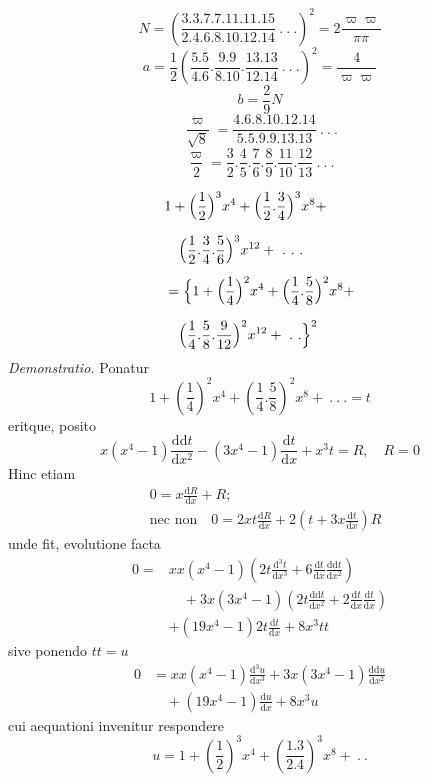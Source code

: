 
\[
N=\left(\frac{3.3.7.7.11.11.15}{2.4.6.8.10.12.14}\ .\ .\ .\right)^2
=2\frac{\varpi\varpi}{\pi\pi}
\]
\[
a=\frac12\left(\frac{5.5}{4.6}.\frac{9.9}{8.10}.\frac{13.13}{12.14}\ .\ .\ .\right)^2
=\frac4{\varpi\varpi}
\]
\[
b=\frac29N
\]
\[
\frac{\varpi}{\surd 8}=\frac{4.6.8.10.12.14}{5.5.9.9.13.13}\ .\ .\ .
\]
\[
\frac{\varpi}{2}=\frac32.\frac45.\frac76.\frac89.\frac{11}{10}.\frac{12}{13}\ .\ .\ .
\]

\[
\begin{aligned}
&1+\Bigl(\frac12\Bigr)^3x^4+\Bigl(\frac12.\frac34\Bigr)^3x^8+
\\[7pt]&\quad{}\Bigl(\frac12.\frac34.\frac56\Bigr)^3x^{12}+\ .\ .\ .\\[5pt]
&=\Bigl\{1+\Bigl(\frac14\Bigr)^2x^4+\Bigl(\frac14.\frac58\Bigr)^2x^8+
\\[7pt]&\quad{}\Bigl(\frac14.\frac58.\frac9{12}\Bigr)^2x^{12}+\ .\ .\Bigr\}^2
\end{aligned}
\]
\textit{Demonstratio.} Ponatur
\[
1+\left(\frac14\right)^2x^4+\left(\frac14.\frac58\right)^2x^8+\ .\ .\ .=t
\]
eritque, posito
\[
x(x^4-1)\frac{\mathrm{dd}t}{\mathrm dx^2}-(3x^4-1)\frac{\mathrm dt}{\mathrm dx}+x^3t=R,\quad R=0
\]
Hinc etiam
\[
\begin{aligned}&0=x\frac{\mathrm dR}{\mathrm dx}+R;\\[7pt]&\text{nec non}\quad
0=2xt\frac{\mathrm dR}{\mathrm dx}+2\left(t+3x\frac{\mathrm dt}{\mathrm dx}\right)R\end{aligned}
\]
unde fit, evolutione facta
\[
\begin{aligned}
0={}&xx(x^4-1)\left(2t\frac{\mathrm d^3t}{\mathrm dx^3}+6\frac{\mathrm dt}{\mathrm dx}\frac{\mathrm{dd}t}{\mathrm dx^2}\right)
\\[7pt]&\quad{}+3x(3x^4-1)\left(2t\frac{\mathrm{dd}t}{\mathrm dx^2}+2\frac{\mathrm dt}{\mathrm dx}\frac{\mathrm dt}{\mathrm dx}\right)\\[5pt]
&+(19x^4-1)2t\frac{\mathrm dt}{\mathrm dx}+8x^3tt
\end{aligned}
\]
sive ponendo $tt=u$
\[
\begin{aligned}0&=xx(x^4-1)\frac{\mathrm d^3u}{\mathrm dx^3}+3x(3x^4-1)\frac{\mathrm{dd}u}{\mathrm dx^2}
\\[7pt]&\quad{}+(19x^4-1)\frac{\mathrm du}{\mathrm dx}+8x^3u\end{aligned}
\]
cui aequationi invenitur respondere
\[
u=1+\left(\frac12\right)^3x^4+\left(\frac{1.3}{2.4}\right)^3x^8+\ .\ .
\]

